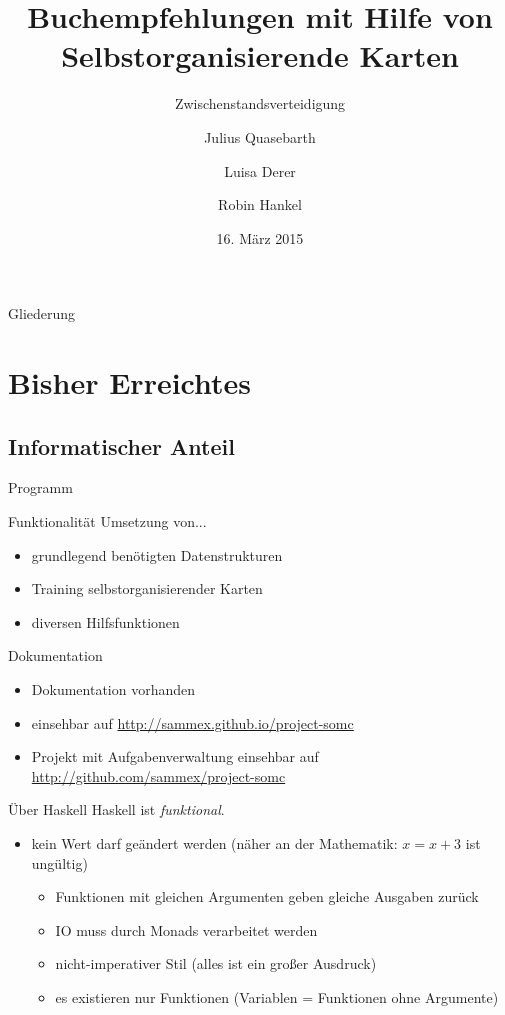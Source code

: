 \documentclass{beamer}
\title{Buchempfehlungen mit Hilfe von Selbstorganisierende Karten}
\subtitle{Zwischenstandsverteidigung}
\author{Julius Quasebarth \and Luisa Derer \and Robin Hankel}
\institute{Albert Schweitzer Gymnasium Erfurt, Spez.}
\date{16. März 2015}
\begin{document}
\maketitle

\begin{frame}{Gliederung}
\tableofcontents
\end{frame}

\section{Bisher Erreichtes}

\subsection{Informatischer Anteil}

\begin{frame}{Programm}
\begin{block}{Funktionalität}
Umsetzung von...
\pause
\begin{itemize}[<+->]
\item grundlegend benötigten Datenstrukturen
\item Training selbstorganisierender Karten
\item diversen Hilfsfunktionen
\end{itemize}
\end{block}
\pause
\begin{block}{Dokumentation}
\begin{itemize}[<+->]
\item Dokumentation vorhanden
\item einsehbar auf \url{http://sammex.github.io/project-somc}
\item Projekt mit Aufgabenverwaltung einsehbar auf \url{http://github.com/sammex/project-somc}
\end{itemize}
\end{block}
\end{frame}

\begin{frame}{Über Haskell}
Haskell ist \emph{funktional}.
\begin{itemize}[<+->]
\item kein Wert darf geändert werden (näher an der Mathematik: \(x = x +  3\) ist ungültig)
	\begin{itemize}[<+->]
	\item Funktionen mit gleichen Argumenten geben gleiche Ausgaben zurück
	\item IO muss durch \glqq{}Monads\grqq{} verarbeitet werden
	\item nicht-imperativer Stil (alles ist ein großer Ausdruck)
	\item es existieren nur Funktionen (Variablen = Funktionen ohne Argumente)
	\end{itemize}
\end{itemize}
\end{frame}
\end{document}
